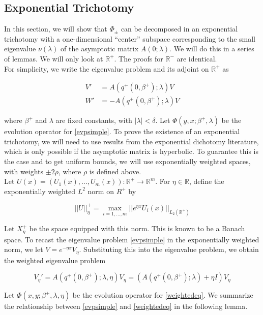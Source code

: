 \documentclass[12pt]{article}
\def\R{{\mathbb R}}
\begin{document}
\subsection{Exponential Trichotomy}

In this section, we will show that $\Phi_\pm$ can be decomposed in an exponential trichotomy with a one-dimensional ``center'' subspace corresponding to the small eigenvalue $\nu(\lambda)$ of the asymptotic matrix $A(0; \lambda)$. We will do this in a series of lemmas. We will only look at $\R^+$. The proofs for $\R^-$ are identical.\\

For simplicity, we write the eigenvalue problem and its adjoint on $\R^+$ as 

\begin{align}
V' &= A(q^+(0, \beta^+); \lambda) V \label{evpsimple}\\
W' &= -A(q^+(0, \beta^+); \lambda) V \label{evpsimpleW}
\end{align}

where $\beta^+$ and $\lambda$ are fixed constants, with $|\lambda| < \delta$. Let $\Phi(y, x; \beta^+, \lambda)$ be the evolution operator for \eqref{evpsimple}. To prove the existence of an exponential trichotomy, we will need to use results from the exponential dichotomy literature, which is only possible if the asymptotic matrix is hyperbolic. To guarantee this is the case and to get uniform bounds, we will use exponentially weighted spaces, with weights $\pm 2 \rho$, where $\rho$ is defined above.\\

Let $U(x) = (U_1(x), \dots, U_m(x)): \R^+ \rightarrow \R^m$. For $\eta \in \R$, define the exponentially weighted $L^2$ norm on $R^+$ by

\[
||U||_\eta^+ = \max_{i = 1, \dots, m} ||e^{\eta x}U_i(x)||_{L_2(\R^+)}
\]

Let $X^+_\eta$ be the space equipped with this norm. This is known to be a Banach space. To recast the eigenvalue problem \eqref{evpsimple} in the exponentially weighted norm, we let $V = e^{-\eta x} V_\eta$. Substituting this into the eigenvalue problem, we obtain the weighted eigenvalue problem

\begin{equation}\label{weightedeq}
V_\eta' = A(q^+(0, \beta^+); \lambda, \eta) V_\eta = (A(q^+(0, \beta^+); \lambda) + \eta I) V_\eta
\end{equation}

Let $\Phi(x, y; \beta^+, \lambda, \eta)$ be the evolution operator for \eqref{weightedeq}. We summarize the relationship between \eqref{evpsimple} and \eqref{weightedeq} in the following lemma.
\end{document}
